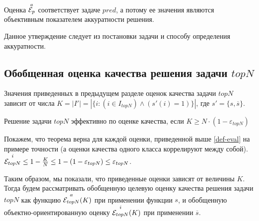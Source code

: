 \begin{assert}
	\label{objectivity-eap}
	Оценка ${\overset{a}{\mathcal{E}_{p}}}$ соответствует задаче $pred$, а потому ее значения
	являются объективным показателем аккуратности решения.
\end{assert}
Данное утверждение следует из постановки задачи и способу определения
аккуратности.
\subsection{Обобщенная оценка качества решения задачи $topN$}
Значения приведенных в предыдущем разделе оценок качества задачи $topN$ зависит
от числа
$K = |I'| = |\{i: (i \in I_{topN}) \wedge (s'(i) = 1)\}|$,
где $s' = \{s, \overline{s}\}$.

\begin{trm}
	Решение задачи $topN$ эффективно по оценке качества, если $K \ge N \cdot (1 - \varepsilon_{topN})$
\end{trm}

Покажем, что теорема верна для каждой оценки, приведенной выше \ref{def-eval}
на примере точности (а оценки качества одного класса коррелируют между собой).
		${\overset{i}{\mathcal{E}_{topN}}} \le 1 - \frac{K}{N} \le 1 - (1 - \varepsilon_{topN}) \le
		\varepsilon_{topN}$.
%

Таким образом, мы показали, что приведенные оценки зависят от величины $K$.
Тогда будем рассматривать обобщенную целевую оценку качества решения задачи
$topN$ как функцию ${\overset{a}{\mathcal{E}_{topN}}}(K)$ при применении функции $s$,
и обобщенную объектно-ориентированную оценку ${\overset{i}{\mathcal{E}_{topN}}}(K)$ при применении
$\overline{s}$.


